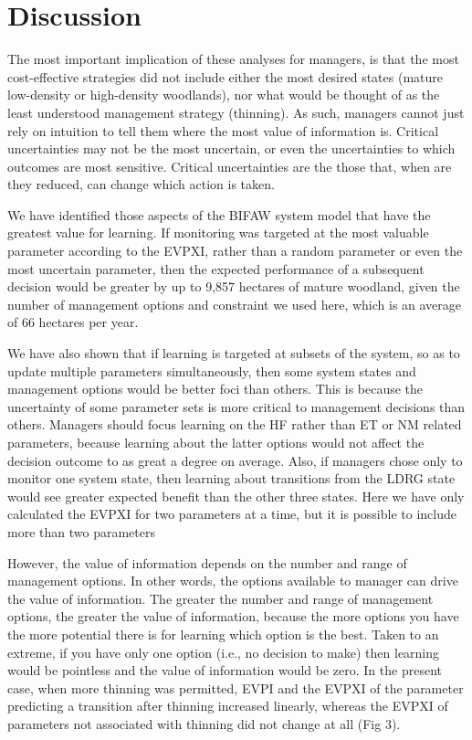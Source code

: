 \documentclass[draft]{article}
\theoremstyle{definition}
\theoremstyle{definition}
\theoremstyle{definition}
\theoremstyle{remark}
\begin{document}
\section*{Discussion}\label{discussion}

The most important implication of these analyses for managers, is that
the most cost-effective strategies did not include either the most
desired states (mature low-density or high-density woodlands), nor what
would be thought of as the least understood management strategy
(thinning). As such, managers cannot just rely on intuition to tell them
where the most value of information is. Critical uncertainties may not
be the most uncertain, or even the uncertainties to which outcomes are
most sensitive. Critical uncertainties are the those that, when are they
reduced, can change which action is taken.

We have identified those aspects of the BIFAW system model that have the
greatest value for learning. If monitoring was targeted at the most
valuable parameter according to the EVPXI, rather than a random
parameter or even the most uncertain parameter, then the expected
performance of a subsequent decision would be greater by up to 9,857
hectares of mature woodland, given the number of management options and
constraint we used here, which is an average of 66 hectares per year.

We have also shown that if learning is targeted at subsets of the
system, so as to update multiple parameters simultaneously, then some
system states and management options would be better foci than others.
This is because the uncertainty of some parameter sets is more critical
to management decisions than others. Managers should focus learning on
the HF rather than ET or NM related parameters, because learning about
the latter options would not affect the decision outcome to as great a
degree on average. Also, if managers chose only to monitor one system
state, then learning about transitions from the LDRG state would see
greater expected benefit than the other three states. Here we have only
calculated the EVPXI for two parameters at a time, but it is possible to
include more than two parameters \citep[see
e.g.,][]{Bates2014, Bates2015}

However, the value of information depends on the number and range of
management options. In other words, the options available to manager can
drive the value of information. The greater the number and range of
management options, the greater the value of information, because the
more options you have the more potential there is for learning which
option is the best. Taken to an extreme, if you have only one option
(i.e., no decision to make) then learning would be pointless and the
value of information would be zero. In the present case, when more
thinning was permitted, EVPI and the EVPXI of the parameter predicting a
transition after thinning increased linearly, whereas the EVPXI of
parameters not associated with thinning did not change at all (Fig 3).
\end{document}
